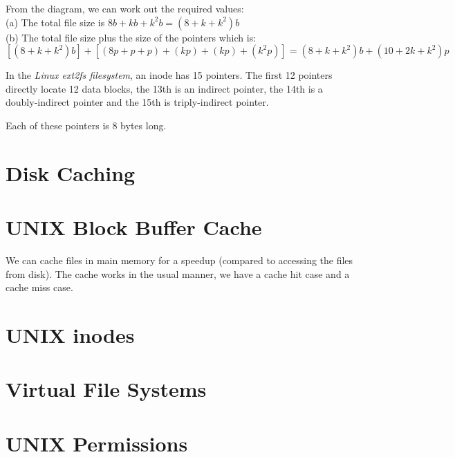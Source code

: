 From the diagram, we can work out the required values:\\
(a) The total file size is $8b + kb + k^2b = (8+k+k^2)b$ \\
(b) The total file size plus the size of the pointers which is:
$[(8+k+k^2)b] + [(8p + p + p) + (kp) + (kp) + (k^2p)] = (8+k+k^2)b + (10+2k+k^2)p$










\begin{example}
In the \textit{Linux ext2fs filesystem}, an inode has 15 pointers.
The first 12 pointers directly locate 12 data blocks, 
the 13th is an indirect pointer, the 14th is a doubly-indirect pointer and the 
15th is triply-indirect pointer. 

Each of these pointers is 8 bytes long.

\end{example}


\section{Disk Caching}



\section{UNIX Block Buffer Cache}

We can cache files in main memory for a speedup (compared to accessing the files 
from disk). The cache works in the usual manner, we have a cache hit case and a 
cache miss case.



\section{UNIX inodes}




\section{Virtual File Systems}


\section{UNIX Permissions}



